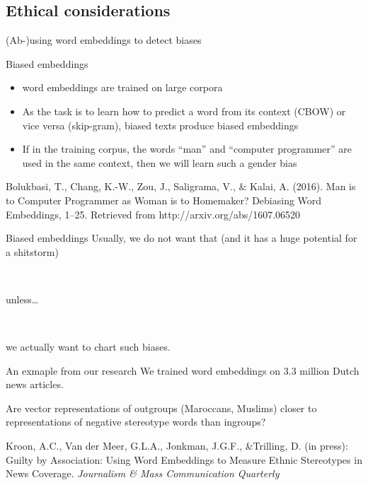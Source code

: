 \documentclass[compress]{beamer}
\begin{document}
\subsection{Ethical considerations}

\begin{frame}[plain]
	(Ab-)using word embeddings to detect biases
\end{frame}

\begin{frame}{Biased embeddings}
	\begin{itemize}
		\item word embeddings are trained on large corpora
		\item As the task is to learn how to predict a word from its context (CBOW) or vice versa (skip-gram), biased texts produce biased embeddings
		\item If in the training corpus, the words ``man'' and ``computer programmer'' are used in the same context, then we will learn such a gender bias
	\end{itemize}
	
	\tiny{Bolukbasi, T., Chang, K.-W., Zou, J., Saligrama, V., \& Kalai, A. (2016). Man is to Computer Programmer as Woman is to Homemaker? Debiasing Word Embeddings, 1–25. Retrieved from http://arxiv.org/abs/1607.06520}
\end{frame}


\begin{frame}{Biased embeddings}
	Usually, we do not want that (and it has a huge potential for a shitstorm)
	
	~\\
	\pause
	
	unless\ldots
	
	~\\
	\pause
	
	we actually want to chart such biases.
	
\end{frame}


\begin{frame}{An exmaple from our research}
We trained word embeddings on 3.3 million Dutch news articles.
	
Are vector representations of outgroups (Maroccans, Muslims) closer to representations of negative stereotype words than ingroups?
\vspace{.5cm}
	
\tiny{Kroon, A.C., Van der Meer, G.L.A., Jonkman, J.G.F., \&Trilling, D. (in press): Guilty by Association: Using Word Embeddings to Measure Ethnic Stereotypes in News Coverage. \emph{Journalism \& Mass
			Communication Quarterly}}
\end{frame}
\end{document}
